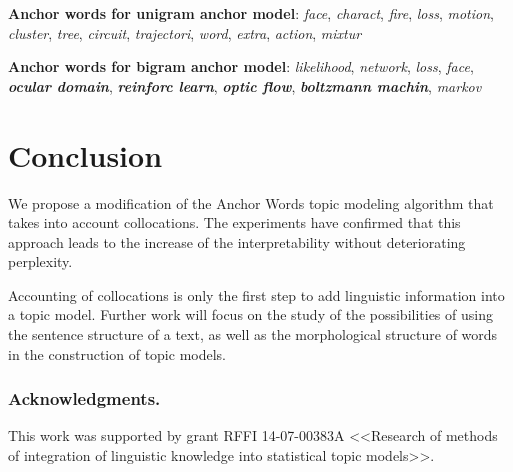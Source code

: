 \documentclass[runningheads,a4paper]{llncs}
\begin{document}
	\noindent \textbf{Anchor words for unigram anchor model}: \emph{face}, \emph{charact}, \emph{fire}, \emph{loss}, \emph{motion}, \emph{cluster}, \emph{tree}, \emph{circuit}, \emph{trajectori}, \emph{word}, \emph{extra}, \emph{action}, \emph{mixtur}
	
	\noindent \textbf{Anchor words for bigram anchor model}: \emph{likelihood}, \emph{network}, \emph{loss}, \emph{face}, \textbf{\emph{ocular domain}}, \textbf{\emph{reinforc learn}}, \textbf{\emph{optic flow}}, \textbf{\emph{boltzmann machin}}, \emph{markov}

	\section{Conclusion}
	We propose a modification of the Anchor Words topic modeling algorithm that takes into account collocations. The experiments have confirmed that this approach leads to the increase of the interpretability without deteriorating perplexity. 
	
	Accounting of collocations is only the first step to add linguistic information into  a topic model. Further work will focus on the study of the possibilities of using the sentence structure of a text, as well as the morphological structure of words in the construction of topic models.
    \bigskip
    \subsubsection*{Acknowledgments.}
	This work was supported by grant RFFI 14-07-00383A <<Research of methods of integration of linguistic knowledge into statistical topic models>>.
	{}
	
	
\end{document}
